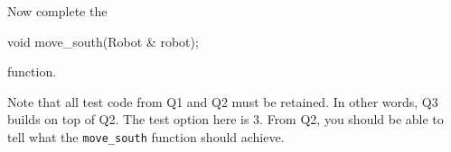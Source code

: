 Now complete the
{\small
\begin{console}
void move_south(Robot & robot);
\end{console}
}
function.

Note that all test code from Q1 and Q2 must be retained.
In other words, Q3 builds on top of Q2.
The test option here is 3.
From Q2, you should be able to tell what the
\verb!move_south! function should achieve.
